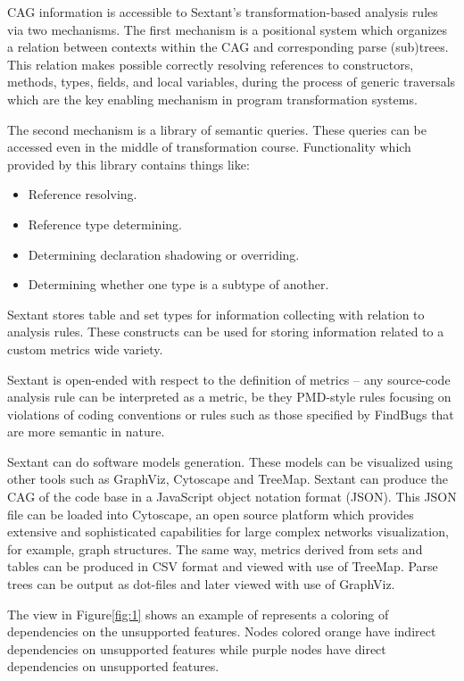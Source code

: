 CAG information is accessible to Sextant’s transformation-based analysis rules via two mechanisms. The first mechanism is a positional system which organizes a relation between contexts within the CAG and corresponding parse (sub)trees. This relation makes possible correctly resolving references to constructors, methods, types, fields, and local variables, during the process of generic traversals which are the key enabling mechanism in program transformation systems.

The second mechanism is a library of semantic queries. These queries can be accessed even in the middle of transformation course. Functionality which provided by this library contains things like:
\begin{itemize}
	\item Reference resolving.
	\item Reference type determining.
	\item Determining declaration shadowing or overriding.
	\item Determining whether one type is a subtype of another.
\end{itemize}
 
Sextant stores table and set types for information collecting with relation to analysis rules. These constructs can be used for storing information related to a custom metrics wide variety.

Sextant is open-ended with respect to the definition of metrics – any source-code analysis rule can be interpreted as a metric, be they PMD-style rules focusing on violations of coding conventions or rules such as those specified by FindBugs that are more semantic in nature\cite{sextant}.

Sextant can do software models generation. These models can be visualized using other tools such as GraphViz, Cytoscape and TreeMap. Sextant can produce the CAG of the code base in a JavaScript object notation format (JSON). This JSON file can be loaded into Cytoscape, an open source platform which provides extensive and sophisticated capabilities for large complex networks visualization, for example, graph structures. The same way, metrics derived from sets and tables can be produced in CSV format and viewed with use of TreeMap. Parse trees can be output as dot-files and later viewed with use of GraphViz.

The view in Figure\ref{fig:1} shows an example of represents a coloring of dependencies on the unsupported features. Nodes colored orange have indirect dependencies on unsupported features while purple nodes have direct dependencies on unsupported features.

